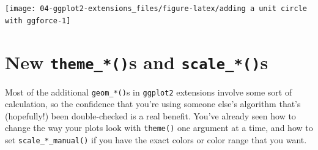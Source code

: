 \documentclass[
]{book}
\newenvironment{Shaded}{\begin{snugshade}}{\end{snugshade}}
\newcommand{\AttributeTok}[1]{\textcolor[rgb]{0.13,0.29,0.53}{#1}}
\newcommand{\DecValTok}[1]{\textcolor[rgb]{0.00,0.00,0.81}{#1}}
\newcommand{\FloatTok}[1]{\textcolor[rgb]{0.00,0.00,0.81}{#1}}
\newcommand{\FunctionTok}[1]{\textcolor[rgb]{0.13,0.29,0.53}{\textbf{#1}}}
\newcommand{\NormalTok}[1]{#1}
\newcommand{\SpecialCharTok}[1]{\textcolor[rgb]{0.81,0.36,0.00}{\textbf{#1}}}
\newcommand{\StringTok}[1]{\textcolor[rgb]{0.31,0.60,0.02}{#1}}
\begin{document}
\begin{Shaded}
\end{Shaded}

\begin{center}\texttt{[image: 04-ggplot2-extensions\_files/figure-latex/adding a unit circle with ggforce-1]} \end{center}

\hypertarget{new-theme_s-and-scale_s}{%
\section{\texorpdfstring{New \texttt{theme\_*()}s and \texttt{scale\_*()}s}{New theme\_*()s and scale\_*()s}}\label{new-theme_s-and-scale_s}}

Most of the additional \texttt{geom\_*()}s in \texttt{ggplot2} extensions involve some sort of calculation, so the confidence that you're using someone else's algorithm that's (hopefully!) been double-checked is a real benefit. You've already seen how to change the way your plots look with \texttt{theme()} one argument at a time, and how to set \texttt{scale\_*\_manual()} if you have the exact colors or color range that you want.
\end{document}
